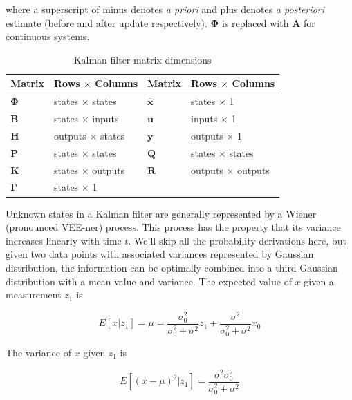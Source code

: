 \documentclass[10pt,conference,compsoc]{IEEEtran}
\newcommand{\mtx}[1] {\bm #1}
\begin{document}
where a superscript of minus denotes \textit{a priori} and plus denotes
\textit{a posteriori} estimate (before and after update respectively).
$\mtx{\Phi}$ is replaced with $\mtx{A}$ for continuous systems. \\

\begin{table}[ht]
  \caption{Kalman filter matrix dimensions}
  \renewcommand{\arraystretch}{1.5}
  \centering
  \begin{tabular}{|ll|ll|}
    \hline
    \textbf{Matrix} & \textbf{Rows $\times$ Columns} &
    \textbf{Matrix} & \textbf{Rows $\times$ Columns} \\
    \hline
    $\mtx{\Phi}$ & states $\times$ states & $\hat{\mtx{x}}$ & states $\times$ 1 \\
    $\mtx{B}$ & states $\times$ inputs & $\mtx{u}$ & inputs $\times$ 1 \\
    $\mtx{H}$ & outputs $\times$ states & $\mtx{y}$ & outputs $\times$ 1 \\
    $\mtx{P}$ & states $\times$ states & $\mtx{Q}$ & states $\times$ states \\
    $\mtx{K}$ & states $\times$ outputs & $\mtx{R}$ & outputs $\times$ outputs \\
    $\mtx{\Gamma}$ & states $\times$ 1 &  &  \\
    \hline
  \end{tabular}
  \label{tab:kf_matrix_dims}
\end{table}

Unknown states in a Kalman filter are generally represented by a Wiener
(pronounced VEE-ner) process. This process has the property that its variance
increases linearly with time $t$. We'll skip all the probability derivations
here, but given two data points with associated variances represented by
Gaussian distribution, the information can be optimally combined into a third
Gaussian distribution with a mean value and variance. The expected value of $x$
given a measurement $z_1$ is

\begin{equation}
  E[x|z_1] = \mu = \frac{\sigma_0^2}{\sigma_0^2 + \sigma^2}z_1 +
    \frac{\sigma^2}{\sigma_0^2 + \sigma^2}x_0
\end{equation}

The variance of $x$ given $z_1$ is

\begin{equation}
  E[(x - \mu)^2|z_1] = \frac{\sigma^2 \sigma_0^2}{\sigma_0^2 + \sigma^2}
\end{equation}
\end{document}
